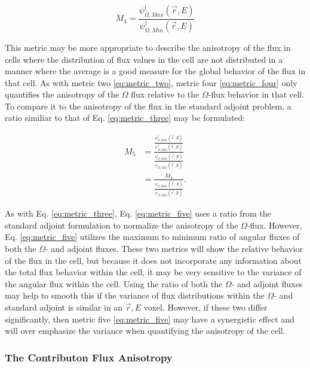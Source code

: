 \begin{equation}
  M_{4} = \frac{\psi_{\Omega, Max}^{\dagger}(\vec {r} ,E)}{\psi_{\Omega,
                 Min}^{\dagger}(\vec {r} ,E)}
  \label{eq:metric_four}
\end{equation}

This metric may be more appropriate to describe the anisotropy of the flux in
cells where the distribution of flux values in the cell are not distributed in a
manner where the average is a good measure for the global behavior of the flux
in that cell. As with metric two \eqref{eq:metric_two}, metric four
\eqref{eq:metric_four} only quantifies
the anisotropy of the $\Omega$ flux relative to the $\Omega$-flux behavior in
that cell. To compare it to the anisotropy of the flux in the standard adjoint
problem, a ratio similiar to that of Eq. \ref{eq:metric_three} may be
formulated:

\begin{equation}
  \begin{split}
    M_{5} & = \frac{\frac{\psi_{\Omega, Max}^{\dagger}(\vec {r} ,E)}{\psi_{\Omega,
                  Min}^{\dagger}(\vec {r} ,E)}}{\frac{\psi_{\Omega,
                  Max}(\vec {r} ,E)}{\psi_{\Omega, Min}(\vec {r} ,E)}} \\
        & = \frac{M_{4}}{\frac{\psi_{\Omega, Max}(\vec {r} ,E)}
                  {\psi_{\Omega, Min}(\vec {r} ,E)}} .
  \end{split}
  \label{eq:metric_five}
\end{equation}

As with Eq. \ref{eq:metric_three}, Eq. \ref{eq:metric_five} uses a ratio from
the standard adjoint formulation to normalize the anisotropy of the
$\Omega$-flux. However, Eq. \ref{eq:metric_five} utilizes the maximum to minimum
ratio of angular fluxes of both the $\Omega$- and adjoint fluxes. These two
metrics will show the relative behavior of the flux in the cell, but because it
does not incorporate any information about the total flux behavior within the
cell, it may be very sensitive to the variance of the angular flux within the
cell. Using the ratio of both the $\Omega$- and adjoint fluxes may
help to smooth this if the variance of flux distributions within the $\Omega$-
and standard adjoint is similar in an $\vec{r}, E$ voxel. However, if these two
differ significantly, then metric five \eqref{eq:metric_five} may have a synergistic effect
and will over emphasize the variance when quantifying the anisotropy of the
cell.

\subsubsection{The Contributon Flux Anisotropy}

